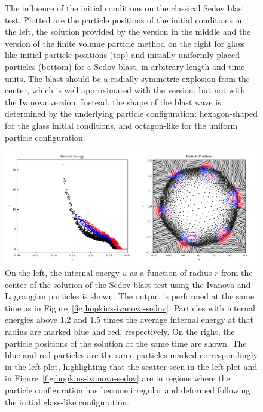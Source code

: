\begin{figure}
\endminipage
\caption{
The influence of the initial conditions on the classical Sedov blast test. Plotted are the particle
positions of the initial conditions on the left, the solution provided by the
\citet{hopkinsGIZMONewClass2015} version in the middle and the
\citet{ivanovaCommonEnvelopeEvolution2013} version of the finite volume particle method on the right
for glass like initial particle positions (top) and initially uniformly placed particles (bottom)
for a Sedov blast, in arbitrary length and time units.
The blast should be a radially symmetric explosion from the center, which is well approximated with
the \citet{hopkinsGIZMONewClass2015} version, but not with the Ivanova version. Instead, the shape
of the blast wave is determined by the underlying particle configuration: hexagon-shaped for the
glass initial conditions, and octagon-like for the uniform particle configuration.
  }
\label{fig:sedov-particle-positions}
\end{figure}




\begin{figure}
    \centering
    \includegraphics[width=.8\textwidth]{figures/Meshless/sedov-ivanova-marked-particles.png}%
    \caption{
On the left, the internal energy $u$ as a function of radius $r$ from the center of the solution of
the Sedov blast test using the Ivanova \Aij and Lagrangian particles is shown. The output is
performed at the same time as in Figure~\ref{fig:hopkins-ivanova-sedov}. Particles with internal
energies above 1.2 and 1.5 times the average internal energy at that radius are marked blue and
red, respectively. On the right, the particle positions of the solution at the same time are shown.
The blue and red particles are the same particles marked correspondingly in the left plot,
highlighting that the scatter seen in the left plot and in Figure~\ref{fig:hopkins-ivanova-sedov}
are in regions where the particle configuration has become irregular and deformed following the
initial glass-like configuration.
    }
    \label{fig:sedov-ivanova-marked}
\end{figure}


